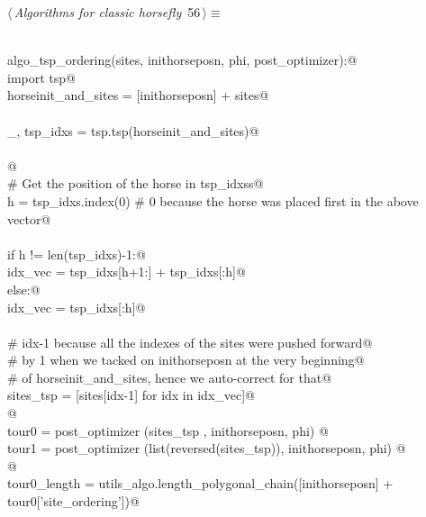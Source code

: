 \documentclass[11.5pt]{report}
\begin{document}
\begin{flushleft} \small\label{scrap81}\raggedright\small
{} $\langle\,${\itshape Algorithms for classic horsefly}\nobreak\ {\footnotesize {56}}$\,\rangle\equiv$
\vspace{-1ex}
\begin{list}{}{} \item
\mbox{}\verb@@\\
\mbox{}\verb@def algo_tsp_ordering(sites, inithorseposn, phi, post_optimizer):@\\
\mbox{}\verb@    import tsp@\\
\mbox{}\verb@    horseinit_and_sites = [inithorseposn] + sites@\\
\mbox{}\verb@@\\
\mbox{}\verb@    _, tsp_idxs = tsp.tsp(horseinit_and_sites)@\\
\mbox{}\verb@@\\
\mbox{}\verb@          @\\
\mbox{}\verb@    # Get the position of the horse in tsp_idxss@\\
\mbox{}\verb@    h = tsp_idxs.index(0) # 0 because the horse was placed first in the above vector@\\
\mbox{}\verb@@\\
\mbox{}\verb@    if h != len(tsp_idxs)-1:@\\
\mbox{}\verb@        idx_vec = tsp_idxs[h+1:] + tsp_idxs[:h]@\\
\mbox{}\verb@    else:@\\
\mbox{}\verb@        idx_vec = tsp_idxs[:h]@\\
\mbox{}\verb@@\\
\mbox{}\verb@    # idx-1 because all the indexes of the sites were pushed forward@\\
\mbox{}\verb@    # by 1 when we tacked on inithorseposn at the very beginning@\\
\mbox{}\verb@    # of horseinit_and_sites, hence we auto-correct for that@\\
\mbox{}\verb@    sites_tsp = [sites[idx-1] for idx in idx_vec]@\\
\mbox{}\verb@    @\\
\mbox{}\verb@    tour0    = post_optimizer (sites_tsp                , inithorseposn, phi) @\\
\mbox{}\verb@    tour1    = post_optimizer (list(reversed(sites_tsp)), inithorseposn, phi) @\\
\mbox{}\verb@    @\\
\mbox{}\verb@    tour0_length = utils_algo.length_polygonal_chain([inithorseposn] + tour0['site_ordering'])@\\

\end{list}
\end{flushleft}
\end{document}
